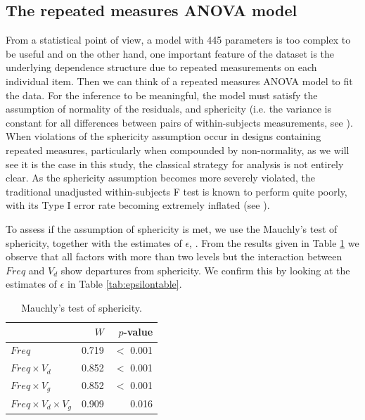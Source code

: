 \documentclass[sn-mathphys]{sn-jnl}%
\theoremstyle{thmstyleone}%
\theoremstyle{thmstyletwo}%
\theoremstyle{thmstylethree}%
\begin{document}
\subsection{The repeated measures ANOVA model} \label{sec:anovaCheck}
\noindent From a statistical point of view, a model with 445 parameters is too complex to be useful and on the other hand, one important feature of the dataset is the underlying dependence structure  due to repeated measurements on each individual item. Then we can think of a repeated measures ANOVA model to fit the data. For the inference to be meaningful, the model must satisfy the assumption of normality of the residuals, and sphericity (i.e. the variance is constant for all differences between pairs of within-subjects measurements, see \cite{BHN2000}). When violations of the sphericity assumption occur in designs containing repeated measures, particularly when compounded by non-normality, as we will see it is the case in this study, the classical strategy for analysis is not entirely clear. As the sphericity assumption becomes more severely violated, the traditional unadjusted within-subjects F test is known to perform quite poorly, with its Type I error rate becoming extremely inflated (see \cite{BHN2000}).


To assess if the assumption of sphericity is met, we use the Mauchly's test of sphericity, together with the estimates of $\epsilon$, \cite{BHN2000}. From the results given in Table \ref{fig:mauchyls} we observe that all factors with more than two levels but the interaction between $Freq$ and $V_d$ show departures from sphericity. We confirm this by looking at the estimates of $\epsilon$ in Table \ref{tab:epsilontable}. 

\begin{table}[!t]
	\centering
	\begin{tabular}{lrr}
		\hline
		& $W$ &  $p$-value \\ 
		\hline
		$Freq$ & 0.719 & $<$ 0.001 \\ 
		$Freq \times V_d$ & 0.852   & $<$ 0.001 \\ 
		$Freq \times V_g$ & 0.852   & $<$ 0.001 \\ 
		$Freq \times V_d \times V_g$ & 0.909  & 0.016 \\ 
		\hline
	\end{tabular}
		\caption{Mauchly's test of sphericity.} 
	\label{fig:mauchyls}
\end{table}
\end{document}

